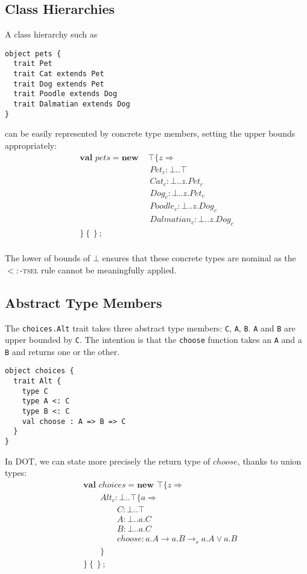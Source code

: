 \documentclass[9pt]{sigplanconf}
\def\code{\lstinline}  % shorter version so you can write \code|String[Foo]|
\newcommand{\mi}[1]{\mathit{#1}}
\newcommand{\gap}{\quad\quad}
\newcommand{\sub}{<:}
\newcommand{\tfun}{\rightarrow}
\newcommand{\tor}{\vee}
\newcommand{\mlrefine}[2]{\{#1 \Rightarrow #2 \}}
\newcommand{\ldefs}[1]{\left\{#1\right\}}
\newcommand{\new}[3]{\textbf{val }#1 = \textbf{new }#2 ;\; #3}
\newcommand{\mlnew}[3]{\textbf{val }#1 = \textbf{new }#2 ;\;\\&#3}
\newcommand{\Ldecl}[3]{#1 : #2..#3}%
\newcommand{\mdecl}[3]{#1 : #2 \tfun #3}
\newcommand{\Top}{\top}%
\newcommand{\Bot}{\bot}%
\newcommand{\arrow}[2]{#1\rightarrow_s#2}
\begin{document}
\subsection{Class Hierarchies}
A class hierarchy such as
\begin{lstlisting}
object pets {
  trait Pet
  trait Cat extends Pet
  trait Dog extends Pet
  trait Poodle extends Dog
  trait Dalmatian extends Dog
}
\end{lstlisting}
can be easily represented by concrete type members, setting the upper
bounds appropriately:
\begin{align*}
\mlnew {\mi{pets}} {&\Top \mlrefine z {\\
&\ \Ldecl {\mi{Pet_c}} \Bot \Top\\
&\ \Ldecl {\mi{Cat_c}} \Bot {z.{\mi{Pet_c}}}\\
&\ \Ldecl {\mi{Dog_c}} \Bot {z.{\mi{Pet_c}}}\\
&\ \Ldecl {\mi{Poodle_c}} \Bot {z.{\mi{Dog_c}}}\\
&\ \Ldecl {\mi{Dalmatian_c}} \Bot {z.{\mi{Dog_c}}}\\
} \ldefs{}}{}
\end{align*}

The lower of bounds of $\Bot$ ensures that these concrete types are
nominal as the \textsc{$\sub$-tsel} rule cannot be meaningfully
applied.

\subsection{Abstract Type Members}
The \code{choices.Alt} trait takes three abstract type members:
\code{C}, \code{A}, \code{B}. \code{A} and \code{B} are upper bounded
by \code{C}. The intention is that the \code{choose} function takes an
\code{A} and a \code{B} and returns one or the other.
\begin{lstlisting}
object choices {
  trait Alt {
    type C
    type A <: C
    type B <: C
    val choose : A => B => C
  }
}
\end{lstlisting}
In DOT, we can state more precisely the return type of $\mi{choose}$,
thanks to union types:
\begin{align*}
&\new {\mi{choices}} {\Top \mlrefine z {\\
&\gap\Ldecl {\mi{Alt_c}} {\Bot} {\Top \mlrefine a {\\
&\gap\gap\Ldecl C \Bot \Top\\
&\gap\gap\Ldecl A \Bot {a.C}\\
&\gap\gap\Ldecl B \Bot {a.C}\\
&\gap\gap\mdecl {\mi{choose}} {a.A} {\arrow {a.B} {a.A \tor a.B}}\\
&\gap}}\\
&}\ldefs{}}{}
\end{align*}
\end{document}
